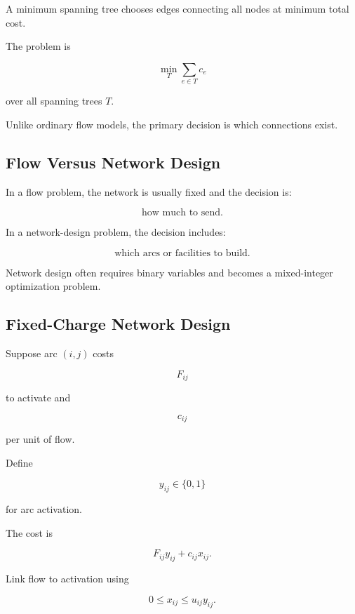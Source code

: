A minimum spanning tree chooses edges connecting all nodes at minimum total
cost.

The problem is

\[
\boxed{
\min_{T}
\sum_{e\in T}
c_e
}
\]

over all spanning trees \(T\).

Unlike ordinary flow models, the primary decision is which connections
exist.

\subsection{Flow Versus Network Design}
\label{subsec:flow-versus-network-design}

In a flow problem, the network is usually fixed and the decision is:

\[
\boxed{
\text{how much to send}.
}
\]

In a network-design problem, the decision includes:

\[
\boxed{
\text{which arcs or facilities to build}.
}
\]

Network design often requires binary variables and becomes a
mixed-integer optimization problem.

\subsection{Fixed-Charge Network Design}
\label{subsec:fixed-charge-network-design}

Suppose arc \((i,j)\) costs

\[
F_{ij}
\]

to activate and

\[
c_{ij}
\]

per unit of flow.

Define

\[
y_{ij}\in\{0,1\}
\]

for arc activation.

The cost is

\[
\boxed{
F_{ij}y_{ij}
+
c_{ij}x_{ij}.
}
\]

Link flow to activation using

\[
\boxed{
0\leq x_{ij}\leq u_{ij}y_{ij}.
}
\]

